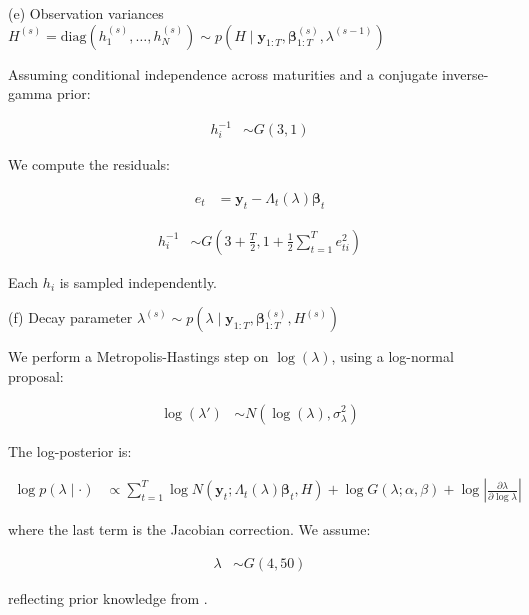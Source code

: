 (e) Observation variances $H^{(s)} = \text{diag}(h_1^{(s)}, \dots, h_N^{(s)}) \sim p(H \mid \mathbf{y}_{1:T}, \mathbf{\beta}_{1:T}^{(s)}, \lambda^{(s-1)})$

Assuming conditional independence across maturities and a conjugate inverse-gamma prior:

\begin{align*}
h_i^{-1} &\sim G(3, 1)
\end{align*}

We compute the residuals:

\begin{align*}
e_t &= \mathbf{y}_t - \Lambda_t(\lambda) \mathbf{\beta}_t
\end{align*}

\begin{align*}
h_i^{-1} &\sim G\left(3 + \frac{T}{2}, 1 + \frac{1}{2} \sum_{t=1}^{T} e_{ti}^2\right)
\end{align*}

Each $h_i$ is sampled independently.

(f) Decay parameter $\lambda^{(s)} \sim p(\lambda \mid \mathbf{y}_{1:T}, \mathbf{\beta}_{1:T}^{(s)}, H^{(s)})$

We perform a Metropolis-Hastings step on $\log(\lambda)$, using a log-normal proposal:

\begin{align*}
\log(\lambda') &\sim N(\log(\lambda), \sigma_\lambda^2)
\end{align*}

The log-posterior is:

\begin{align*}
\log p(\lambda \mid \cdot) &\propto \sum_{t=1}^{T} \log N(\mathbf{y}_t; \Lambda_t(\lambda) \mathbf{\beta}_t, H) + \log G(\lambda; \alpha, \beta) + \log \left| \frac{\partial \lambda}{\partial \log \lambda} \right|
\end{align*}

where the last term is the Jacobian correction. We assume:

\begin{align*}
\lambda &\sim G(4, 50)
\end{align*}

reflecting prior knowledge from \citet{diebold2006macroeconomy}.
